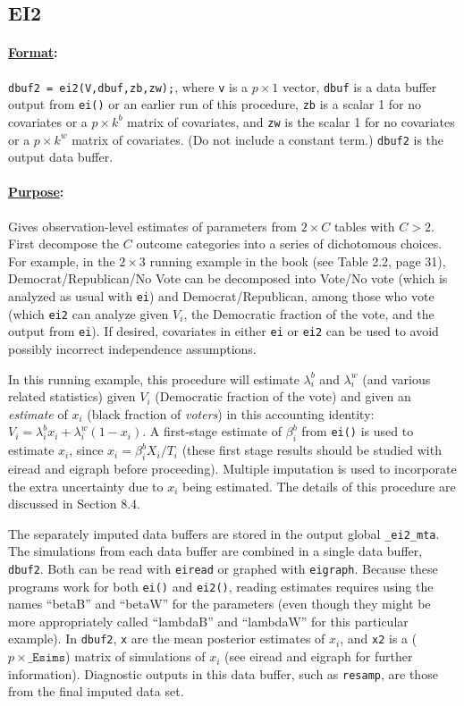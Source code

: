 \documentclass[11pt,titlepage]{article}
\begin{document}
\subsection{EI2}

\paragraph{\underline{Format}:} \texttt{dbuf2 = ei2(V,dbuf,zb,zw);},
where \texttt{v} is a $p\times 1$ vector, \texttt{dbuf} is a data
buffer output from \texttt{ei()} or an earlier run of this procedure,
\texttt{zb} is a scalar 1 for no covariates or a $p\times k^b$ matrix
of covariates, and \texttt{zw} is the scalar 1 for no covariates or a
$p\times k^w$ matrix of covariates.  (Do not include a constant term.)
\texttt{dbuf2} is the output data buffer.

\paragraph{\underline{Purpose}:}
Gives observation-level estimates of parameters from $2\times C$
tables with $C>2$.  First decompose the $C$ outcome categories into a
series of dichotomous choices.  For example, in the $2\times 3$
running example in the book (see Table 2.2, page 31),
Democrat/Republican/No Vote can be decomposed into Vote/No vote (which
is analyzed as usual with \texttt{ei}) and Democrat/Republican, among
those who vote (which \texttt{ei2} can analyze given $V_i$, the
Democratic fraction of the vote, and the output from \texttt{ei}).  If
desired, covariates in either \texttt{ei} or \texttt{ei2} can be used
to avoid possibly incorrect independence assumptions.

In this running example, this procedure will estimate $\lambda^b_i$
and $\lambda_i^w$ (and various related statistics) given $V_i$
(Democratic fraction of the vote) and given an \emph{estimate} of
$x_i$ (black fraction of \emph{voters}) in this accounting identity:
$V_i = \lambda^b_ix_i + \lambda^w_i(1-x_i)$.  A first-stage estimate
of $\beta_i^b$ from \texttt{ei()} is used to estimate $x_i$, since
$x_i=\beta_i^bX_i/T_i$ (these first stage results should be studied
with eiread and eigraph before proceeding).  Multiple imputation is
used to incorporate the extra uncertainty due to $x_i$ being
estimated.  The details of this procedure are discussed in Section
8.4.

The separately imputed data buffers are stored in the output global
\texttt{\_ei2\_mta}.  The simulations from each data buffer are
combined in a single data buffer, \texttt{dbuf2}.  Both can be read
with \texttt{eiread} or graphed with \texttt{eigraph}. Because these
programs work for both \texttt{ei()} and \texttt{ei2()}, reading
estimates requires using the names ``betaB'' and ``betaW'' for the
parameters (even though they might be more appropriately called
``lambdaB'' and ``lambdaW'' for this particular example).  In
\texttt{dbuf2}, \texttt{x} are the mean posterior estimates of $x_i$,
and \texttt{x2} is a ($p\times\texttt{\_Esims}$) matrix of simulations
of $x_i$ (see eiread and eigraph for further information).  Diagnostic
outputs in this data buffer, such as \texttt{resamp}, are those from
the final imputed data set.
\end{document}
